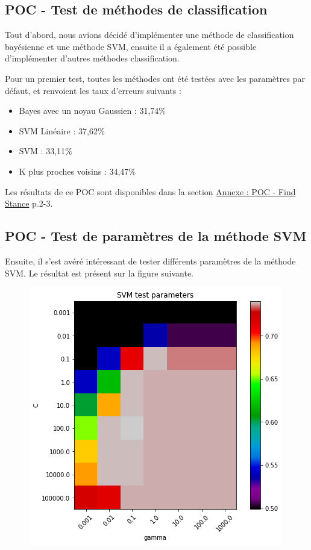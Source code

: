 \subsection{POC - Test de méthodes de classification}

Tout d'abord, nous avions décidé d'implémenter une méthode de classification bayésienne et une méthode SVM, ensuite il a également été possible d'implémenter d'autres méthodes classification.

Pour un premier test, toutes les méthodes ont été testées avec les paramètres par défaut, et renvoient les taux d'erreurs suivants :
\begin{itemize}
\item Bayes avec un noyau Gaussien : 31,74$\%$
\item SVM Linéaire : 37,62$\%$
\item SVM : 33,11$\%$
\item K plus proches voisins : 34,47$\%$
\end{itemize}

Les résultats de ce POC sont disponibles dans la section \hyperref[annexe-stance-detection]{Annexe : POC - Find Stance} p.2-3.

\subsection{POC - Test de paramètres de la méthode SVM}

Ensuite, il s'est avéré intéressant de tester différents paramètres de la méthode SVM. Le résultat est présent sur la figure suivante.

\begin{figure}[!h]
\centering
\includegraphics{src/annexes/POC_FindStance_V2/output_24_0.png}
\end{figure}

